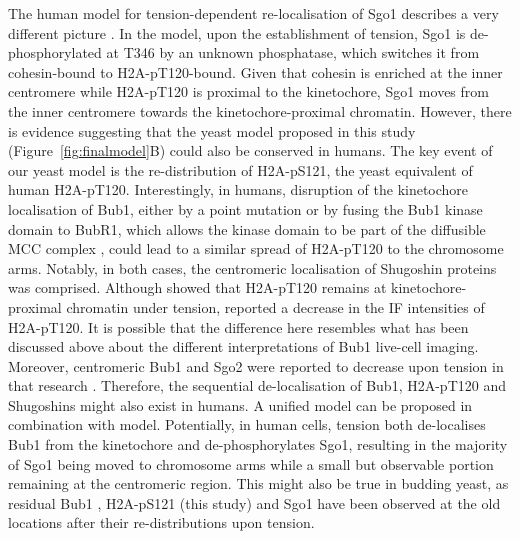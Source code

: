 The human model for tension-dependent re-localisation of Sgo1 describes a very different picture \citep{Liu2013a}. In the model, upon the establishment of tension, Sgo1 is de-phosphorylated at T346 by an unknown phosphatase, which switches it from cohesin-bound to H2A-pT120-bound. Given that cohesin is enriched at the inner centromere while H2A-pT120 is proximal to the kinetochore, Sgo1 moves from the inner centromere towards the kinetochore-proximal chromatin. However, there is evidence suggesting that the yeast model proposed in this study (Figure~\ref{fig:finalmodel}B) could also be conserved in humans. The key event of our yeast model is the re-distribution of H2A-pS121, the yeast equivalent of human H2A-pT120. Interestingly, in humans, disruption of the kinetochore localisation of Bub1, either by a point mutation \citep{Asghar2015} or by fusing the Bub1 kinase domain to BubR1, which allows the kinase domain to be part of the diffusible MCC complex \citep{Wang2022SpatialMitosis}, could lead to a similar spread of H2A-pT120 to the chromosome arms. Notably, in both cases, the centromeric localisation of Shugoshin proteins was comprised. Although \cite{Liu2013a} showed that H2A-pT120 remains at kinetochore-proximal chromatin under tension, \cite{Asai2020} reported a decrease in the IF intensities of H2A-pT120. It is possible that the difference here resembles what has been discussed above about the different interpretations of Bub1 live-cell imaging. Moreover, centromeric Bub1 and Sgo2 were reported to decrease upon tension in that research \citep{Asai2020}. Therefore, the sequential de-localisation of Bub1, H2A-pT120 and Shugoshins might also exist in humans. A unified model can be proposed in combination with \cite{Liu2013a} model. Potentially, in human cells, tension both de-localises Bub1 from the kinetochore and de-phosphorylates Sgo1, resulting in the majority of Sgo1 being moved to chromosome arms while a small but observable portion remaining at the centromeric region. This might also be true in budding yeast, as residual Bub1 \citep{Nerusheva2014, Bokros2021YeastAnaphase}, H2A-pS121 (this study) and Sgo1 \citep{Paldi2020ConvergentPericentromeres} have been observed at the old locations after their re-distributions upon tension. 

